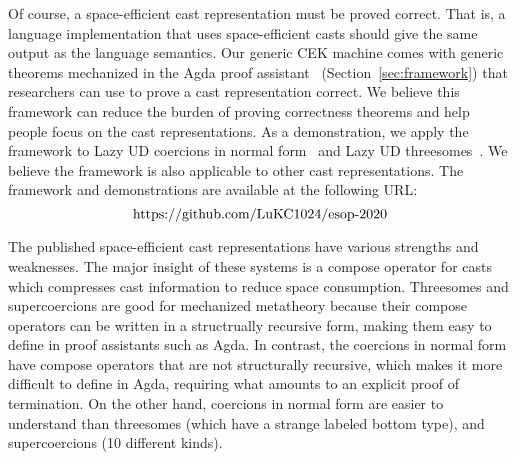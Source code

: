 \documentclass[runningheads]{llncs}
\newcommand{\urlFrameworkAndIllustration}{
	\url{https://github.com/LuKC1024/esop-2020}
}
\begin{document}
Of course, a space-efficient cast representation must be proved
correct. That is, a language implementation that uses space-efficient
casts should give the same output as the language semantics. Our
generic CEK machine comes with generic theorems mechanized in
the Agda proof assistant~\citep{norell2008dependently}
(Section~\ref{sec:framework}) that researchers can use to prove a cast
representation correct.  We believe this framework can reduce the
burden of proving correctness theorems and help people focus on the
cast representations. As a demonstration, we apply the framework to
Lazy UD coercions in normal form~\citep{Siek:2015:BCT:2737924.2737968}
and Lazy UD threesomes~\citep{Siek:2010:TWB:1706299.1706342}. We
believe the framework is also applicable to other cast
representations. The framework and demonstrations are available at the
following URL:
\[\text{\urlFrameworkAndIllustration}\]

The published space-efficient cast representations have various
strengths and weaknesses.  The major insight of these systems is a
compose operator for casts which compresses cast information to reduce
space consumption.  Threesomes and supercoercions are good for
mechanized metatheory because their compose operators 
can be written in a structrually recursive form,
making them easy to define in proof assistants such as
Agda. In contrast, the coercions in normal form have compose operators
that are not structurally recursive, which makes it more difficult to
define in Agda, requiring what amounts to an explicit proof of
termination.
%
On the other hand, coercions in normal form are easier to understand
than threesomes (which have a strange labeled bottom type), and
supercoercions (10 different kinds).
\end{document}
